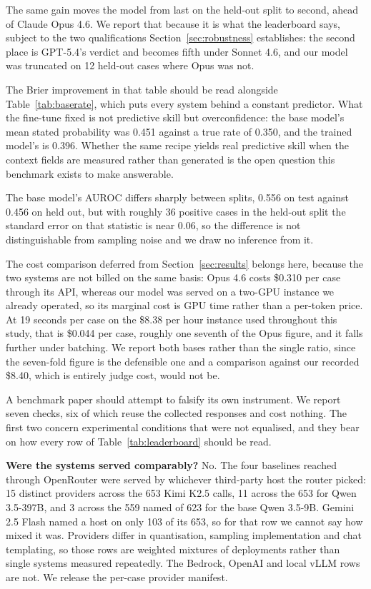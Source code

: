 The same gain moves the model from last on the held-out split to second, ahead of
Claude Opus 4.6. We report that because it is what the leaderboard says, subject
to the two qualifications Section~\ref{sec:robustness} establishes: the second
place is GPT-5.4's verdict and becomes fifth under Sonnet 4.6, and our model was
truncated on 12 held-out cases where Opus was not.

The Brier improvement in that table should be read alongside
Table~\ref{tab:baserate}, which puts every system behind a constant predictor.
What the fine-tune fixed is not predictive skill but overconfidence: the base
model's mean stated probability was 0.451 against a true rate of 0.350, and the
trained model's is 0.396. Whether the same recipe yields real predictive skill
when the context fields are measured rather than generated is the open question
this benchmark exists to make answerable.

The base model's AUROC differs sharply between splits, 0.556 on test against
0.456 on held out, but with roughly 36 positive cases in the held-out split the
standard error on that statistic is near 0.06, so the difference is not
distinguishable from sampling noise and we draw no inference from it.

The cost comparison deferred from Section~\ref{sec:results} belongs here,
because the two systems are not billed on the same basis: Opus 4.6 costs \$0.310
per case through its API, whereas our model was served on a two-GPU instance we
already operated, so its marginal cost is GPU time rather than a per-token price.
At 19 seconds per case on the \$8.38 per hour instance used throughout this
study, that is \$0.044 per case, roughly one seventh of the Opus figure, and it
falls further under batching. We report both bases rather than the single ratio, since the
seven-fold figure is the defensible one and a comparison against our recorded
\$8.40, which is entirely judge cost, would not be.

A benchmark paper should attempt to falsify its own instrument. We report seven
checks, six of which reuse the collected responses and cost nothing. The first
two concern experimental conditions that were not equalised, and they bear on how
every row of Table~\ref{tab:leaderboard} should be read.

\textbf{Were the systems served comparably?} No. The four baselines reached
through OpenRouter were served by whichever third-party host the router picked:
15 distinct providers across the 653 Kimi K2.5 calls, 11 across the 653 for Qwen
3.5-397B, and 3 across the 559 named of 623 for the base Qwen 3.5-9B. Gemini 2.5
Flash named a host on only 103 of its 653, so for that row we cannot say how
mixed it was. Providers differ in quantisation, sampling implementation and chat
templating, so those rows are weighted mixtures of deployments rather than single
systems measured repeatedly. The Bedrock, OpenAI and local vLLM rows are not. We
release the per-case provider manifest.

